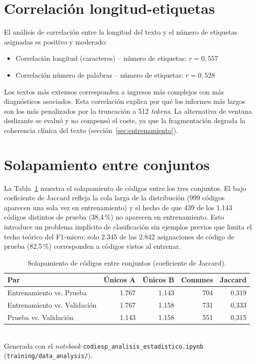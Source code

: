\section{Correlación longitud-etiquetas}

El análisis de correlación entre la longitud del texto y el número de etiquetas asignadas es positivo y moderado:

\begin{itemize}
 \item Correlación longitud (caracteres) -- número de etiquetas: $r = 0{,}557$
 \item Correlación número de palabras -- número de etiquetas: $r = 0{,}528$
\end{itemize}

Los textos más extensos corresponden a ingresos más complejos con más diagnósticos asociados. Esta correlación explica por qué los informes más largos son los más penalizados por la truncación a 512 \emph{tokens}. La alternativa de ventana deslizante se evaluó y no compensó el coste, ya que la fragmentación degrada la coherencia clínica del texto (sección~\ref{sec:entrenamiento}).

\section{Solapamiento entre conjuntos}

La Tabla~\ref{tab:jaccard} muestra el solapamiento de códigos entre los tres conjuntos. El bajo coeficiente de Jaccard refleja la cola larga de la distribución (999 códigos aparecen una sola vez en entrenamiento) y el hecho de que 439 de los 1.143 códigos distintos de prueba (38,4\,\%) no aparecen en entrenamiento. Esto introduce un problema implícito de clasificación sin ejemplos previos que limita el techo teórico del F1-micro: solo 2.345 de las 2.842 asignaciones de código de prueba (82,5\,\%) corresponden a códigos vistos al entrenar.

\begin{table}[h]
\centering
\caption{Solapamiento de códigos entre conjuntos (coeficiente de Jaccard).}
\label{tab:jaccard}
\begin{tabular}{lrrrr}
\hline
\textbf{Par} & \textbf{Únicos A} & \textbf{Únicos B} & \textbf{Comunes} & \textbf{Jaccard} \\
\hline
Entrenamiento vs. Prueba & 1.767 & 1.143 & 704 & 0{,}319 \\
Entrenamiento vs. Validación & 1.767 & 1.158 & 731 & 0{,}333 \\
Prueba vs. Validación & 1.143 & 1.158 & 551 & 0{,}315 \\
\hline
\end{tabular}
\\[4pt]
{\footnotesize Generada con el \emph{notebook} \texttt{codiesp\_\allowbreak{}analisis\_\allowbreak{}estadistico.ipynb} (\texttt{training/\allowbreak{}data\_analysis/}).}
\end{table}

